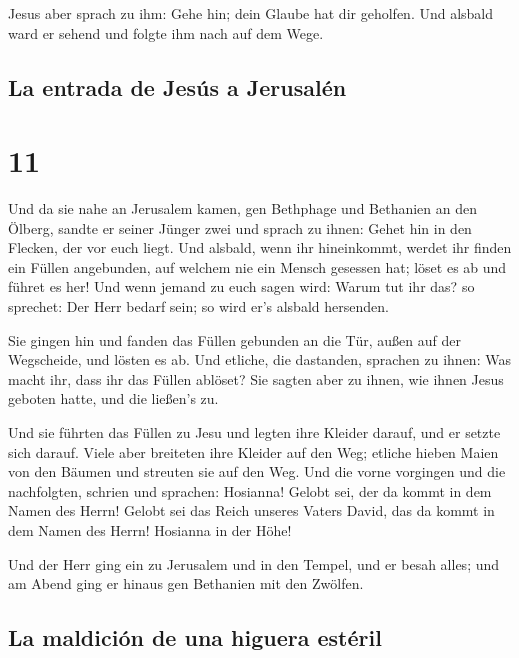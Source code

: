  Jesus aber sprach zu ihm: Gehe hin; dein Glaube hat dir
geholfen. Und alsbald ward er sehend und folgte ihm nach auf dem Wege.

\hypertarget{la-entrada-de-jesuxfas-a-jerusaluxe9n}{%
\subsection{La entrada de Jesús a
Jerusalén}\label{la-entrada-de-jesuxfas-a-jerusaluxe9n}}

\hypertarget{section-10}{%
\section{11}\label{section-10}}

 Und da sie nahe an Jerusalem kamen, gen Bethphage und
Bethanien an den Ölberg, sandte er seiner Jünger zwei  und
sprach zu ihnen: Gehet hin in den Flecken, der vor euch liegt. Und
alsbald, wenn ihr hineinkommt, werdet ihr finden ein Füllen angebunden,
auf welchem nie ein Mensch gesessen hat; löset es ab und führet es her!
 Und wenn jemand zu euch sagen wird: Warum tut ihr das? so
sprechet: Der Herr bedarf sein; so wird er's alsbald hersenden.

 Sie gingen hin und fanden das Füllen gebunden an die Tür,
außen auf der Wegscheide, und lösten es ab.  Und etliche,
die dastanden, sprachen zu ihnen: Was macht ihr, dass ihr das Füllen
ablöset?  Sie sagten aber zu ihnen, wie ihnen Jesus
geboten hatte, und die ließen's zu.

 Und sie führten das Füllen zu Jesu und legten ihre
Kleider darauf, und er setzte sich darauf.  Viele aber
breiteten ihre Kleider auf den Weg; etliche hieben Maien von den Bäumen
und streuten sie auf den Weg.  Und die vorne vorgingen und
die nachfolgten, schrien und sprachen: Hosianna! Gelobt sei, der da
kommt in dem Namen des Herrn!  Gelobt sei das Reich
unseres Vaters David, das da kommt in dem Namen des Herrn! Hosianna in
der Höhe!

 Und der Herr ging ein zu Jerusalem und in den Tempel,
und er besah alles; und am Abend ging er hinaus gen Bethanien mit den
Zwölfen.

\hypertarget{la-maldiciuxf3n-de-una-higuera-estuxe9ril}{%
\subsection{La maldición de una higuera
estéril}\label{la-maldiciuxf3n-de-una-higuera-estuxe9ril}}

